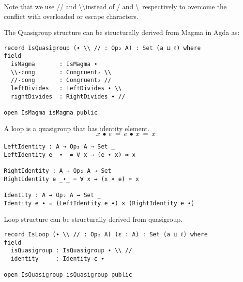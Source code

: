 Note that we use // and \textbackslash\textbackslash instead of / and
\textbackslash \ respectively to overcome the conflict with overloaded or escape
characters. 

The Quasigroup structure can be structurally derived from Magma in Agda as:

\begin{verbatim}
record IsQuasigroup (∙ \\ // : Op₂ A) : Set (a ⊔ ℓ) where
field
  isMagma       : IsMagma ∙
  \\-cong       : Congruent₂ \\
  //-cong       : Congruent₂ //
  leftDivides   : LeftDivides ∙ \\
  rightDivides  : RightDivides ∙ //

open IsMagma isMagma public
\end{verbatim}

A loop is a quasigroup that has identity element.
\begin{equation}\label{eq_lineslope}
x\ ∙\ e\ =\ e\ ∙\ x\ =\ x
\end{equation}

\begin{verbatim}
LeftIdentity : A → Op₂ A → Set _
LeftIdentity e _∙_ = ∀ x → (e ∙ x) ≈ x

RightIdentity : A → Op₂ A → Set _
RightIdentity e _∙_ = ∀ x → (x ∙ e) ≈ x

Identity : A → Op₂ A → Set _
Identity e ∙ = (LeftIdentity e ∙) × (RightIdentity e ∙)
\end{verbatim}

Loop structure can be structurally derived from quasigroup.

\begin{verbatim}
record IsLoop (∙ \\ // : Op₂ A) (ε : A) : Set (a ⊔ ℓ) where
field
  isQuasigroup : IsQuasigroup ∙ \\ //
  identity     : Identity ε ∙

open IsQuasigroup isQuasigroup public
\end{verbatim}

